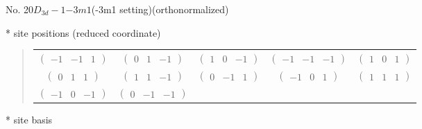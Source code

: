 \documentclass[fleqn,9pt,landscape]{jsarticle}
\begin{document}
\newpage
\begin{center}
\LARGE
No. 20\quad$D_{3d}-1$\quad$-3m1$\quad(-3m1 setting)\quad[ trigonal ] (orthonormalized)
\end{center}
\vspace{5mm}
* site positions (reduced coordinate)
\begin{quote}
\begin{tabular}{ccccc}
$ \begin{pmatrix} -1 & -1 & 1 \end{pmatrix} $ & $ \begin{pmatrix} 0 & 1 & -1 \end{pmatrix} $ & $ \begin{pmatrix} 1 & 0 & -1 \end{pmatrix} $ & $ \begin{pmatrix} -1 & -1 & -1 \end{pmatrix} $ & $ \begin{pmatrix} 1 & 0 & 1 \end{pmatrix} $ \\
$ \begin{pmatrix} 0 & 1 & 1 \end{pmatrix} $ & $ \begin{pmatrix} 1 & 1 & -1 \end{pmatrix} $ & $ \begin{pmatrix} 0 & -1 & 1 \end{pmatrix} $ & $ \begin{pmatrix} -1 & 0 & 1 \end{pmatrix} $ & $ \begin{pmatrix} 1 & 1 & 1 \end{pmatrix} $ \\
$ \begin{pmatrix} -1 & 0 & -1 \end{pmatrix} $ & $ \begin{pmatrix} 0 & -1 & -1 \end{pmatrix} $ & $  $ & $  $ & $  $
\end{tabular}
\end{quote}
* site basis
\end{document}

